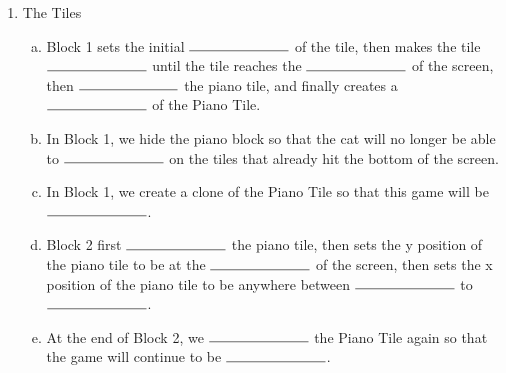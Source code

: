 \documentclass[11pt]{article}
\begin{document}
\begin{enumerate}
\item The Tiles
\begin{enumerate}[a.]
\item Block 1 sets the initial $\rule{2.5cm}{0.15mm}$ of the tile, then makes the tile $\rule{2.5cm}{0.15mm}$ until the tile reaches the $\rule{2.5cm}{0.15mm}$ of the screen, then $\rule{2.5cm}{0.15mm}$ the piano tile, and finally creates a $\rule{2.5cm}{0.15mm}$ of the Piano Tile.
\item In Block 1, we hide the piano block so that the cat will no longer be able to $\rule{2.5cm}{0.15mm}$ on the tiles that already hit the bottom of the screen.
\item In Block 1, we create a clone of the Piano Tile so that this game will be $\rule{2.5cm}{0.15mm}$.
\item Block 2 first $\rule{2.5cm}{0.15mm}$ the piano tile, then sets the y position of the piano tile to be at the $\rule{2.5cm}{0.15mm}$ of the screen, then sets the x position of the piano tile to be anywhere between $\rule{2.5cm}{0.15mm}$ to $\rule{2.5cm}{0.15mm}$.
\item At the end of Block 2, we $\rule{2.5cm}{0.15mm}$ the Piano Tile again so that the game will continue to be $\rule{2.5cm}{0.15mm}$.
\end{enumerate}
\end{enumerate}
\end{document}

